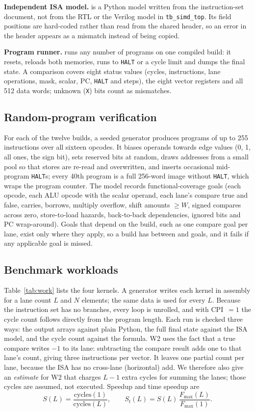 \documentclass[conference]{IEEEtran}
\begin{document}
\textbf{Independent ISA model.}  is a Python model
written from the instruction-set document, not from the RTL or the Verilog
model in \texttt{tb\_simd\_top}. Its field positions are hard-coded rather
than read from the shared header, so an error in the header appears as a
mismatch instead of being copied.

\textbf{Program runner.}  runs any number of programs
on one compiled build: it resets, reloads both memories, runs to \texttt{HALT}
or a cycle limit and dumps the final state. A comparison covers
eight status values (cycles, instructions, lane operations, mask, scalar, PC,
\texttt{HALT} and steps), the eight vector registers and all 512 data words;
unknown (\texttt{X}) bits count as mismatches.

\subsection{Random-program verification}
For each of the twelve builds, a seeded generator produces programs of up to
255 instructions over all sixteen opcodes. It biases operands towards edge values
(0, 1, all ones, the sign bit), sets reserved bits at random, draws addresses
from a small pool so that stores are re-read and overwritten, and inserts
occasional mid-program \texttt{HALT}s; every 40th program is a full 256-word
image without \texttt{HALT}, which wraps the program counter. The model
records functional-coverage goals (each opcode, each ALU opcode with the
scalar operand, each lane's compare true and false, carries, borrows,
multiply overflow, shift amounts $\ge W$, signed compares across zero,
store-to-load hazards, back-to-back dependencies, ignored bits and PC
wrap-around). Goals that depend on the build, such as one compare goal per
lane, exist only where they apply, so a build has between \RandGoalsMin{} and
\RandGoalsMax{} goals, and it fails if any applicable goal is missed.

\subsection{Benchmark workloads}
Table~\ref{tab:work} lists the four kernels. A generator writes each kernel in
assembly for a lane count $L$ and $N$ elements; the same data is used for every
$L$. Because the instruction set has no branches, every loop is unrolled, and
with CPI~$=1$ the cycle count follows directly from the program length. Each
run is checked three ways: the output arrays against plain Python, the full
final state against the ISA model, and the cycle count against the formula.
W2 uses the fact that a true compare writes $-1$ to its lane: subtracting the
compare result adds one to that lane's count, giving three instructions per
vector. It leaves one partial count per lane, because the ISA has no
cross-lane (horizontal) add. We therefore also give an \emph{estimate} for W2
that charges $L-1$ extra cycles for summing the lanes; those cycles are
assumed, not executed. Speedup and time speedup are
\begin{equation}
S(L) = \frac{\text{cycles}(1)}{\text{cycles}(L)},\qquad
S_t(L) = S(L)\,\frac{F_{\max}(L)}{F_{\max}(1)} .
\end{equation}
\end{document}
